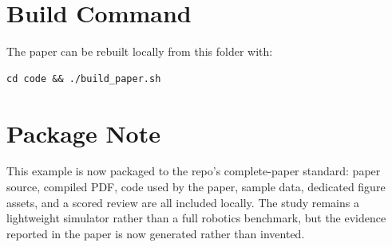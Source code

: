 \section{Build Command}

The paper can be rebuilt locally from this folder with:

\begin{verbatim}
cd code && ./build_paper.sh
\end{verbatim}

\section{Package Note}

This example is now packaged to the repo's complete-paper standard: paper source, compiled PDF, code used by the paper, sample data, dedicated figure assets, and a scored review are all included locally. The study remains a lightweight simulator rather than a full robotics benchmark, but the evidence reported in the paper is now generated rather than invented.
